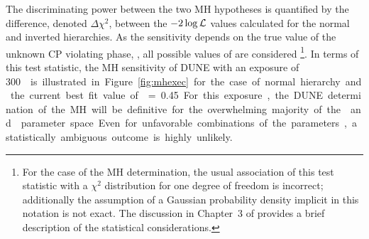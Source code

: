 The discriminating power between the two MH hypotheses is quantified
by the difference, denoted $\Delta \chi^2$, between the
$-2\log{\cal L}$ values calculated for the normal and inverted
hierarchies. As the sensitivity depends on the true value of the unknown
CP violating phase, \deltacp, all possible values of \deltacp are
considered  \footnote{For the case of the MH determination, the usual
  association of this test statistic with a $\chi^2$ distribution for
  one degree of freedom is incorrect; additionally the assumption of a
  Gaussian probability density %
  implicit in this notation is not exact.  The discussion in Chapter~3
  of \volphys provides a brief description of the statistical
  considerations.}.  In terms of this test statistic, the MH
sensitivity of DUNE with an exposure of \SI{300}\ktMWyr{} is
illustrated in Figure~\ref{fig:mhexec} for the case of normal
hierarchy and the current best fit value of  = \SI{0.45}. 
For this exposure, the DUNE determination of the MH will be definitive for
the overwhelming majority of the  \deltacp and  parameter space.
Even for unfavorable combinations of the parameters, a statistically
ambiguous outcome is highly unlikely.  
